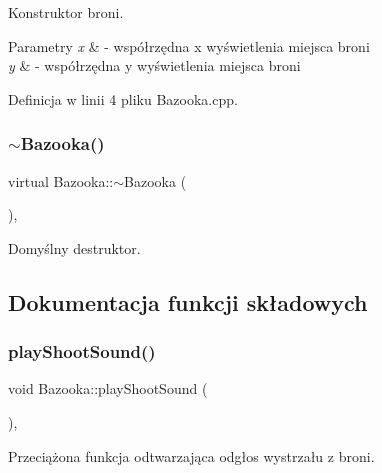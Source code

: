 Konstruktor broni. 


\begin{DoxyParams}{Parametry}
{\em x} & -\/ współrzędna x wyświetlenia miejsca broni \\
\hline
{\em y} & -\/ współrzędna y wyświetlenia miejsca broni \\
\hline
\end{DoxyParams}


Definicja w linii 4 pliku Bazooka.\+cpp.

\mbox{\label{class_bazooka_a25ec2ef6a925a3b13947ad877d2ac823}} 
\subsubsection{\texorpdfstring{$\sim$\+Bazooka()}{~Bazooka()}}
{\footnotesize\ttfamily virtual Bazooka\+::$\sim$\+Bazooka (\begin{DoxyParamCaption}{ }\end{DoxyParamCaption})\hspace{0.3cm}{\ttfamily [virtual]}, {\ttfamily [default]}}



Domyślny destruktor. 



\subsection{Dokumentacja funkcji składowych}
\mbox{\label{class_bazooka_a2645b8043766ec5045e82d452828acdd}} 
\subsubsection{\texorpdfstring{play\+Shoot\+Sound()}{playShootSound()}}
{\footnotesize\ttfamily void Bazooka\+::play\+Shoot\+Sound (\begin{DoxyParamCaption}{ }\end{DoxyParamCaption})\hspace{0.3cm}{\ttfamily [override]}, {\ttfamily [virtual]}}



Przeciążona funkcja odtwarzająca odgłos wystrzału z broni. 



